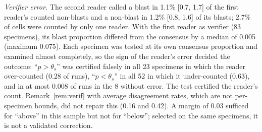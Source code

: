 \documentclass[preprint,12pt]{elsarticle}
\theoremstyle{remark}
\theoremstyle{definition}
\begin{document}
\emph{Verifier error.} The second reader called a blast in 1.1\% [0.7, 1.7] of the first reader's counted non-blasts and a non-blast in 1.2\% [0.8, 1.6] of its blasts; 2.7\% of cells were counted by only one reader. With the first reader as verifier (83 specimens), its blast proportion differed from the consensus by a median of 0.005 (maximum 0.075). Each specimen was tested at its own consensus proportion and examined almost completely, so the sign of the reader's error decided the outcome: ``$p>\theta_s$'' was certified falsely in all 23 specimens in which the reader over-counted (0.28 of runs), ``$p<\theta_s$'' in all 52 in which it under-counted (0.63), and in at most 0.008 of runs in the 8 without error. The test certified the reader's count. Remark~\ref{rem:verif} with average disagreement rates, which are not per-specimen bounds, did not repair this (0.16 and 0.42). A margin of 0.03 sufficed for ``above'' in this sample but not for ``below''; selected on the same specimens, it is not a validated correction.
\end{document}
